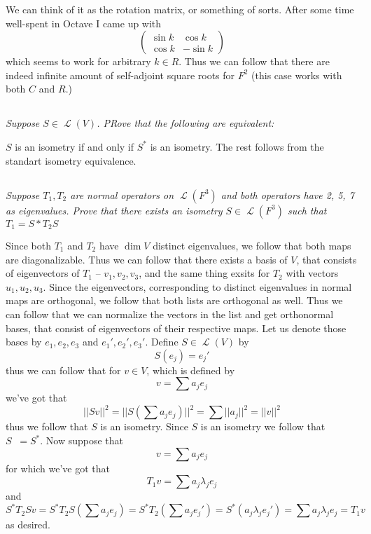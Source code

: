 \documentclass[11pt,oneside,titlepage]{book}
\DeclareMathOperator \map {\mathcal {L}}
\DeclareMathOperator \inv {^{-1}}
\begin{document}
We can think of it as the rotation matrix, or something of sorts. After some
time well-spent in Octave I came up with
$$
\begin{pmatrix}
  \sin k & \cos k \\
  \cos k & - \sin k
\end{pmatrix}
$$
which seems to work for arbitrary $k \in R$. Thus we can follow that there are indeed
infinite amount of self-adjoint square roots for $F^2$ (this case works with both $C$ and $R$.)


\subsection{}

\textit{Suppose $S \in \map(V)$. PRove that the following are equivalent: }

$S$ is an isometry if and only if $S^*$ is an isometry. The rest follows from the standart
isometry equivalence.

\subsection{}

\textit{Suppose $T_1, T_2$ are normal operators on $\map(F^3)$ and both operators have 2, 5, 7
  as eigenvalues. Prove that there exists an isometry $S \in \map(F^3)$ such that $T_1 = S* T_2 S$}

Since both $T_1$ and $T_2$ have $\dim V$ distinct eigenvalues, we follow that both maps are
diagonalizable. Thus we can follow that there exists a basis of $V$, that consists of
eigenvectors of $T_1$ -- $v_1, v_2, v_3$, and the same thing exsits for $T_2$ with
vectors $u_1, u_2, u_3$. Since the eigenvectors, corresponding to distinct eigenvalues
in normal maps are orthogonal, we follow that both lists are orthogonal as well. Thus we
can follow that we can normalize the vectors in the list and get orthonormal bases, that
consist of eigenvectors of their respective maps. Let us denote those bases by $e_1, e_2, e_3$
and $e_1', e_2', e_3'$. Define $S \in \map(V)$ by
$$S(e_j) = e_j'$$
thus we can follow that for $v \in V$, which is defined by
$$v = \sum a_j e_j$$
we've got that
$$||Sv||^2 = ||S(\sum a_j e_j)||^2 = \sum ||a_j||^2 = ||v||^2$$
thus we follow that $S$ is an isometry. Since $S$ is an isometry we follow that $S\inv = S^*$.
Now suppose that
$$v = \sum a_j e_j$$
for which we've got that
$$T_1 v = \sum a_j \lambda_j e_j$$
and
$$S^* T_2 S v = S^* T_2 S (\sum a_j e_j) = S^* T_2 (\sum a_j e_j') = S^* (a_j \lambda_j e_j')  =
\sum a_j \lambda_j e_j = T_1 v$$
as desired.
\end{document}
